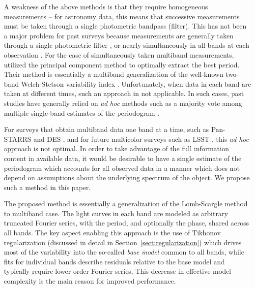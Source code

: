 \documentclass{emulateapj}
\newcommand{\foreign}[1]{{\it #1}}
\newcommand{\adhoc}{\foreign{ad hoc}}
\newcommand{\Sect}[1]{Section~\ref{sect:#1}}
\newcommand{\sect}[1]{\Sect{#1}}
\begin{document}
A weakness of the above methods is that they require homogeneous measurements -- for astronomy data, this means 
that successive measurements must be taken through a single photometric bandpass (filter). This has not been a major
problem for past surveys because measurements are generally taken through a single photometric filter 
\citep [e.g. LINEAR,][]{LINEAR1}, or nearly-simultaneously in all bands at each observation \citep [e.g. SDSS,][]{Sesar2010}.
For the case of simultaneously taken multiband measurements, \cite{Suveges12} utilized the principal component
method to optimally extract the best period. Their method is essentially a multiband generalization of the well-known
two-band Welch-Stetson variability index \citep{WelchStetson1993}. Unfortunately, when data in each band are taken at
different times, such an approach in not applicable. In such cases, past studies have generally relied 
on \adhoc{} methods such as a majority vote among multiple single-band estimates of the 
periodogram \citep[e.g.,][]{Oluseyi12}. 

For surveys that obtain multiband data one band at a time, such as Pan-STARRS \citep{Kaiser2010} and DES \citep{Flaugher08},
and for future multicolor surveys such as LSST \citep{Ivezic08LSST}, this \adhoc{} approach is not optimal. In order to take 
advantage of the full information content in available data, it would be desirable to have a single estimate of the periodogram 
which accounts for all observed data in a manner which does not depend on assumptions about the underlying spectrum of the object. 
We propose such a method in this paper. 

The proposed method is essentially a generalization of the Lomb-Scargle method to 
multiband case. The light curves in  each band are modeled as arbitrary truncated Fourier series, 
with the period, and optionally the phase, shared across all bands. The key aspect enabling this approach is the use of Tikhonov regularization 
(discussed in detail in \sect{regularization}) which drives most of the variability into the so-called {\it base 
model} common to all bands, while fits for individual bands describe residuals relative to the base model 
and typically require lower-order Fourier series. This decrease in effective model complexity is the
main reason for improved performance. 
\end{document}
